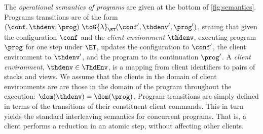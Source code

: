  




The \emph{operational semantics of programs} are given at the bottom of \cref{fig:semantics}. 
Programs transitions are of the form $(\conf,  \thdenv, \prog) \ \toG{\lambda}_{\ET} (\conf',  \thdenv', \prog')$,
stating that given the configuration $\conf$ and the \emph{client environment} $\thdenv$, executing program $\prog$ for one step under $\ET$, updates the configuration to $\conf'$, the client environment to $\thdenv'$, and the program to its continuation $\prog'$. 
A \emph{client environment}, $\thdenv \in \ThdEnv$, is a mapping from client identifiers to pairs of stacks and views. 
We assume that the clients in the domain of client environments are are those in the domain of the program throughout the execution: 
$\dom(\thdenv) = \dom(\prog)$.
Program transitions are simply defined in terms of the transitions of their constituent client commands.
This in turn yields the standard interleaving semantics for concurrent programs. 
That is, a client performs a reduction in an atomic step, without affecting other clients.


%




